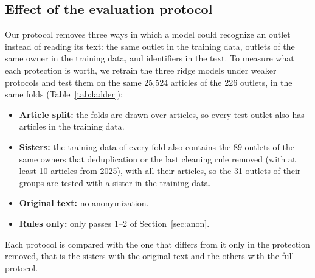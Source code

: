 \documentclass[11pt,a4paper]{article}
\begin{document}
\subsection{Effect of the evaluation protocol}\label{sec:ladder}
Our protocol removes three ways in which a model could recognize an outlet instead of reading its text: the same outlet
in the training data, outlets of the same owner in the training data, and identifiers in the text. To measure what each
protection is worth, we retrain the three ridge models under weaker protocols and test them on the same 25,524
articles of the 226 outlets, in the same folds (Table~\ref{tab:ladder}):
\begin{itemize}
  \item \textbf{Article split:} the folds are drawn over articles, so every test outlet also has articles in the
        training data.
  \item \textbf{Sisters:} the training data of every fold also contains the 89 outlets of the same owners that
        deduplication or the last cleaning rule removed (with at least 10 articles from 2025), with all their articles,
        so the 31 outlets of their groups are tested with a sister in the training data.
  \item \textbf{Original text:} no anonymization.
  \item \textbf{Rules only:} only passes 1--2 of Section~\ref{sec:anon}.
\end{itemize}
Each protocol is compared with the one that differs from it only in the protection removed, that is the sisters with the
original text and the others with the full protocol.
\end{document}

